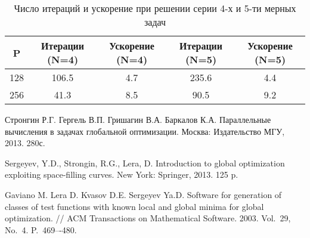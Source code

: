\documentclass[11pt, oneside, a4paper]{article}
\begin{document}
\begin{table}[!hbp]
    \centering
    \caption{Число итераций и ускорение при решении серии 4-х и 5-ти мерных задач}
    \begin{tabular}{|c|c|c|c|c|}
    \hline
    P    & Итерации (N=4) & Ускорение (N=4) &         Итерации (N=5) & Ускорение (N=5) \\ \hline
	128 & 106.5   & 4.7      &         235.6   & 4.4      \\ \hline
	256 & 41.3    & 8.5      &         90.5    & 9.2      \\ \hline
	\end{tabular}
    
    \label{table:GKLS_RES}
\end{table}



\begin{biblio}



Стронгин Р.Г. Гергель В.П. Гришагин В.А. Баркалов К.А. Параллельные вычисления
в задачах глобальной оптимизации.
Москва: Издательство МГУ,
2013. 280с.



Sergeyev, Y.D., Strongin, R.G., Lera, D. Introduction to global optimization exploiting space-filling curves. 
New York: Springer, 2013. 125 p.





Gaviano M. Lera D. Kvasov D.E. Sergeyev Ya.D. Software for generation of classes of test functions with known local and global minima for global optimization. // ACM Transactions on Mathematical Software. 2003. Vol.~29, No.~4. P.~469–-480.



\end{biblio}
\end{document}
